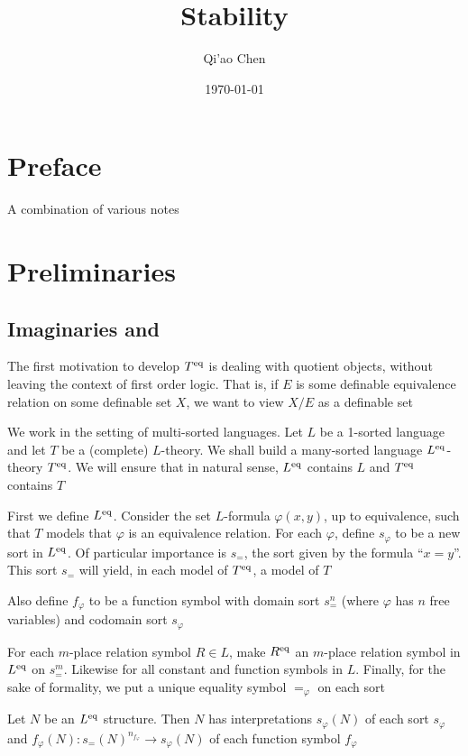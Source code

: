 \documentclass[11pt]{article}
\author{Qi'ao Chen}
\date{\today}
\title{Stability}
\begin{document}
\maketitle
\tableofcontents


\section{Preface}
\label{sec:orgf105c04}
A combination of various notes \cite{PillayNoteStability} \cite{ChernNoteStability}
\section{Preliminaries}
\label{sec:org61bf49a}
\subsection{Imaginaries and}
\label{sec:org78b8410}
The first motivation to develop \(T^{\operatorname{eq}}\) is dealing with quotient objects, without leaving
the context of first order logic. That is, if \(E\) is some definable equivalence relation on
some definable set \(X\), we want to view \(X/E\) as a definable set

We work in the setting of multi-sorted languages. Let \(L\) be a 1-sorted language and let \(T\)
be a (complete) \(L\)-theory. We shall build a many-sorted
language \(L^{\operatorname{eq}}\)-theory \(T^{\operatorname{eq}}\). We will ensure that in natural sense, \(L^{\operatorname{eq}}\)
contains \(L\) and \(T^{\operatorname{eq}}\) contains \(T\)

First we define \(L^{\operatorname{eq}}\). Consider the set \(L\)-formula \(\varphi(x,y)\), up to equivalence, such
that \(T\) models that \(\varphi\) is an equivalence relation. For each \(\varphi\), define \(s_\varphi\) to be a new sort
in \(L^{\operatorname{eq}}\). Of particular importance is \(s_=\), the sort given by the formula ``\(x=y\)''.
This sort \(s_=\) will yield, in each model of \(T^{\operatorname{eq}}\), a model of \(T\)

Also define \(f_\varphi\) to be a function symbol with domain sort \(s^n_=\) (where \(\varphi\) has \(n\) free
variables) and codomain sort \(s_\varphi\)

For each \(m\)-place relation symbol \(R\in L\), make \(R^{\operatorname{eq}}\) an \(m\)-place relation symbol
in \(L^{\operatorname{eq}}\) on \(s_=^m\). Likewise for all constant and function symbols in \(L\). Finally, for
the sake of formality, we put a unique equality symbol \(=_\varphi\) on each sort

\begin{remark}
Let \(N\) be an \(L^{\operatorname{eq}}\) structure. Then \(N\) has interpretations \(s_\varphi(N)\) of each
sort \(s_\varphi\) and \(f_\varphi(N):s_=(N)^{n_{f_\varphi}}\to s_\varphi(N)\) of each function symbol \(f_\varphi\)
\end{remark}
\end{document}
